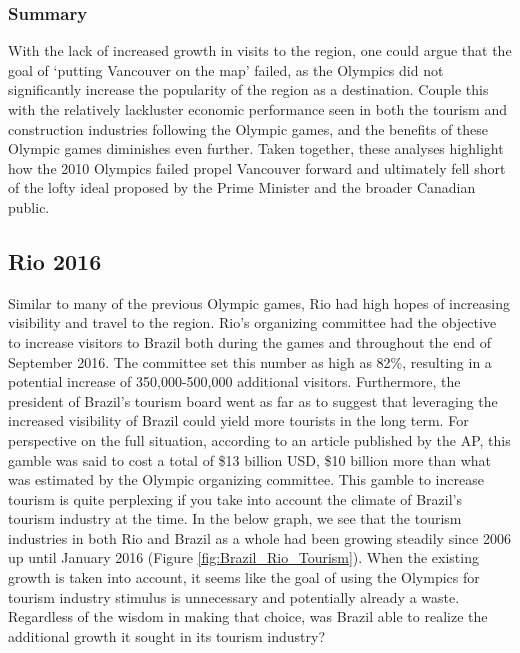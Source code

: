 \documentclass[11pt, twocolumn]{article}
\begin{document}
\begin{enumerate}
   \subsubsection{Summary} 
    
    With the lack of increased growth in visits to the region, one could argue that the goal of ‘putting Vancouver on the map' failed, as the Olympics did not significantly increase the popularity of the region as a destination. Couple this with the relatively lackluster economic performance seen in both the tourism and construction industries following the Olympic games, and the benefits of these Olympic games diminishes even further. Taken together, these analyses highlight how the 2010 Olympics failed propel Vancouver forward and ultimately fell short of the lofty ideal proposed by the Prime Minister and the broader Canadian public. 

\end{enumerate}

\subsection{Rio 2016}

Similar to many of the previous Olympic games, Rio had high hopes of increasing visibility and travel to the region. Rio’s organizing committee had the objective to increase visitors to Brazil both during the games and throughout the end of September 2016. The committee set this number as high as 82\%, resulting in a potential increase of 350,000-500,000 additional visitors. Furthermore, the president of Brazil's tourism board went as far as to suggest that leveraging the increased visibility of Brazil could yield more tourists in the long term.\cite{theconversation} For perspective on the full situation, according to an article published by the AP, this gamble was said to cost a total of \$13 billion USD, \$10 billion more than what was estimated by the Olympic organizing committee.\cite{ap} This gamble to increase tourism is quite perplexing if you take into account the climate of Brazil's tourism industry at the time. In the below graph, we see that the tourism industries in both Rio and Brazil as a whole had been growing steadily since 2006 up until January 2016 (Figure \ref{fig:Brazil_Rio_Tourism}). When the existing growth is taken into account, it seems like the goal of using the Olympics for tourism industry stimulus is unnecessary and potentially already a waste. Regardless of the wisdom in making that choice, was Brazil able to realize the additional growth it sought in its tourism industry?
\end{document}
